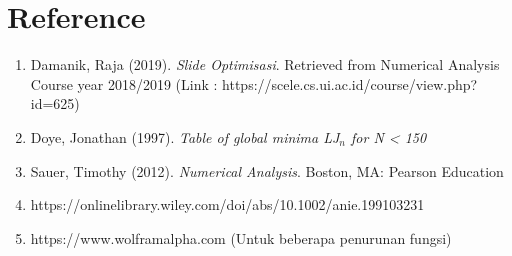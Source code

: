 \documentclass[11pt]{article}
\begin{document}
\section{Reference}
\begin{enumerate}
    \item Damanik, Raja (2019). \textit{Slide Optimisasi}. Retrieved from Numerical Analysis Course year 2018/2019 (Link : https://scele.cs.ui.ac.id/course/view.php?id=625)
    \item Doye, Jonathan (1997). \textit{Table of global minima LJ$_{n}$ for N < 150} 
    \item Sauer, Timothy (2012). \textit{Numerical Analysis}. Boston, MA: Pearson Education
    \item https://onlinelibrary.wiley.com/doi/abs/10.1002/anie.199103231
    \item https://www.wolframalpha.com (Untuk beberapa penurunan fungsi)

\end{enumerate}

\end{document}
